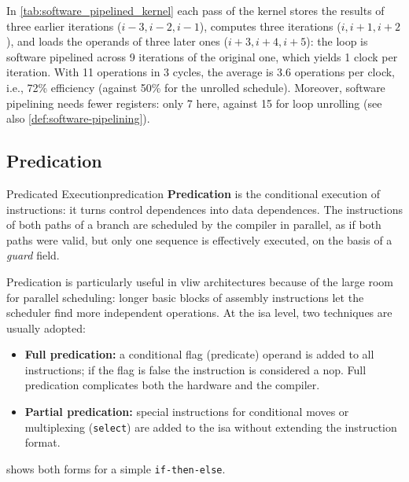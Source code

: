 In \cref{tab:software_pipelined_kernel} each pass of the kernel stores the results of three earlier iterations ($i-3, i-2, i-1$), computes three iterations ($i, i+1, i+2$), and loads the operands of three later ones ($i+3, i+4, i+5$): the loop is software pipelined across 9 iterations of the original one, which yields 1 clock per iteration. With 11 operations in 3 cycles, the average is 3.6 operations per clock, i.e., 72\% efficiency (against 50\% for the unrolled schedule). Moreover, software pipelining needs fewer registers: only 7 here, against 15 for loop unrolling (see also \cref{def:software-pipelining}).

\subsection{Predication}
\label{sec:vliw_predication}

\begin{definition}{Predicated Execution}{predication}
    \textbf{Predication} is the conditional execution of instructions: it turns control dependences into data dependences. The instructions of both paths of a branch are scheduled by the compiler in parallel, as if both paths were valid, but only one sequence is effectively executed, on the basis of a \textit{guard} field.
\end{definition}

Predication is particularly useful in \gls{vliw} architectures because of the large room for parallel scheduling: longer basic blocks of assembly instructions let the scheduler find more independent operations. At the \gls{isa} level, two techniques are usually adopted:
\begin{itemize}
    \item \textbf{Full predication:} a conditional flag (predicate) operand is added to all instructions; if the flag is false the instruction is considered a \gls{nop}. Full predication complicates both the hardware and the compiler.
    \item \textbf{Partial predication:} special instructions for conditional moves or multiplexing (\texttt{select}) are added to the \gls{isa} without extending the instruction format.
\end{itemize}
 shows both forms for a simple \texttt{if-then-else}.

